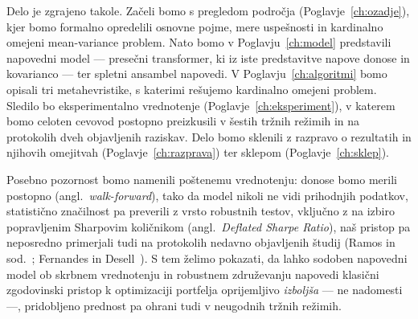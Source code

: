 Delo je zgrajeno takole. Začeli bomo s pregledom področja (Poglavje~\ref{ch:ozadje}), kjer bomo formalno opredelili osnovne pojme, mere uspešnosti in kardinalno omejeni mean-variance problem. Nato bomo v Poglavju~\ref{ch:model} predstavili napovedni model --- presečni transformer, ki iz iste predstavitve napove donose in kovarianco --- ter spletni ansambel napovedi. V Poglavju~\ref{ch:algoritmi} bomo opisali tri metahevristike, s katerimi rešujemo kardinalno omejeni problem. Sledilo bo eksperimentalno vrednotenje (Poglavje~\ref{ch:eksperiment}), v katerem bomo celoten cevovod postopno preizkusili v šestih tržnih režimih in na protokolih dveh objavljenih raziskav. Delo bomo sklenili z razpravo o rezultatih in njihovih omejitvah (Poglavje~\ref{ch:razprava}) ter sklepom (Poglavje~\ref{ch:sklep}).

Posebno pozornost bomo namenili poštenemu vrednotenju: donose bomo merili postopno (angl.\ \emph{walk-forward}), tako da model nikoli ne vidi prihodnjih podatkov, statistično značilnost pa preverili z vrsto robustnih testov, vključno z na izbiro popravljenim Sharpovim količnikom (angl.\ \emph{Deflated Sharpe Ratio}), naš pristop pa neposredno primerjali tudi na protokolih nedavno objavljenih študij (Ramos in sod.~\cite{ramos2023}; Fernandes in Desell~\cite{fernandes2026}). S tem želimo pokazati, da lahko sodoben napovedni model ob skrbnem vrednotenju in robustnem združevanju napovedi klasični zgodovinski pristop k optimizaciji portfelja oprijemljivo \emph{izboljša} --- ne nadomesti ---, pridobljeno prednost pa ohrani tudi v neugodnih tržnih režimih.
